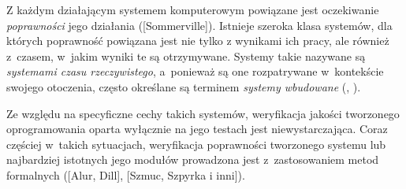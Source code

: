 \documentclass[a4paper,11pt]{article}
\begin{document}
    
    Z każdym działającym systemem komputerowym powiązane jest oczekiwanie
    {\em poprawności} jego działania ([Sommerville]). Istnieje szeroka
    klasa systemów, dla których poprawność powiązana jest nie tylko z
    wynikami ich pracy, ale również z~czasem, w~jakim wyniki te są
    otrzymywane. Systemy takie nazywane są {\em systemami czasu
    rzeczywistego}, a~ponieważ są one rozpatrywane  w~kontekście swojego
    otoczenia, często określane są terminem {\em systemy wbudowane}
    (\cite{Fencott:CCS:95}, \cite{MetodyFormalneWInzynieriiOprogramowaniaSystemowCzasuRzeczywistego}).

    Ze względu na specyficzne cechy takich systemów, weryfikacja jakości
    tworzonego oprogramowania oparta wyłącznie na jego testach jest
    niewystarczająca. Coraz częściej w~takich sytuacjach, weryfikacja
    poprawności tworzonego systemu lub najbardziej istotnych jego
    modułów prowadzona jest z~zastosowaniem metod formalnych
    ([Alur, Dill], [Szmuc, Szpyrka i inni]).

    
\end{document}
